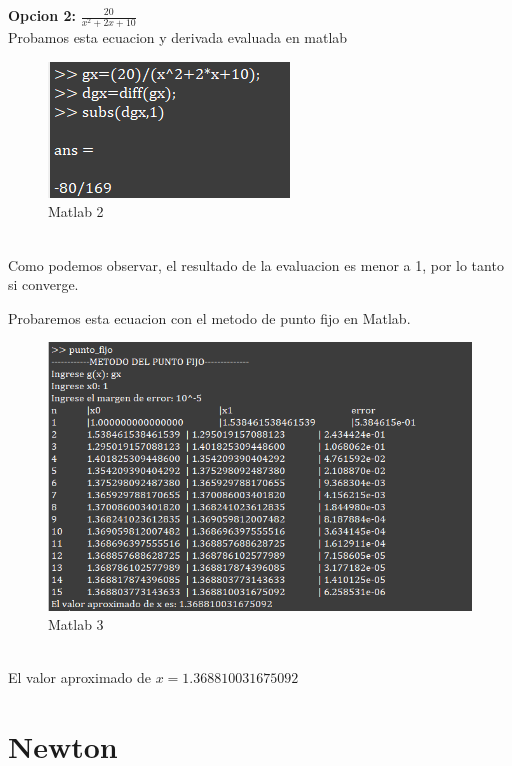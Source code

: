 \documentclass{article}
\theoremstyle{mytheoremstyle}
\theoremstyle{mytheoremstyle}
\theoremstyle{myproblemstyle}
\begin{document}
    \textbf{Opcion 2: }$\frac{20}{x^2+2x+10}$
    \noindent \\Probamos esta ecuacion y derivada evaluada en matlab
    \begin{figure}[ht]
        \includegraphics*[scale=0.9]{img/ejemplo_clasePunto_2.png}
        \caption[Derivada y evaluacion g'(x)]{Matlab 2}
    \end{figure}
    \\Como podemos observar, el resultado de la evaluacion es menor a 1, por lo tanto si converge.

    \noindent Probaremos esta ecuacion con el metodo de punto fijo en Matlab.
    \begin{figure}[ht]
        \includegraphics[scale=0.8]{img/ejemplo_clasePunto_3.png}
        \caption[Metodo Punto Fijo]{Matlab 3}
    \end{figure}
    \\El valor aproximado de $x=1.368810031675092$


    \section*{Newton}
\end{document}
